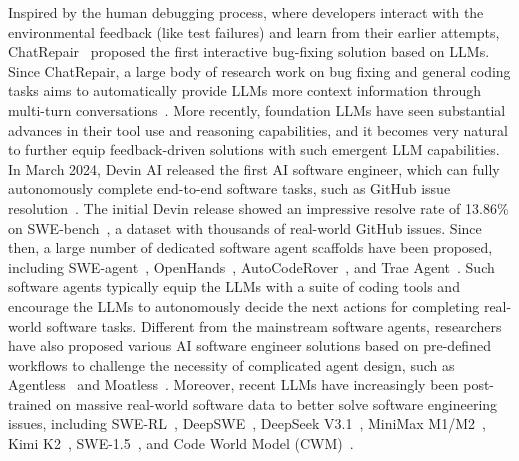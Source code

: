 \documentclass{article}
\renewcommand{\cite}{\citep}
\newcommand{\chatrepair}{ChatRepair\xspace}
\newcommand{\agentless}{Agentless\xspace}
\newcommand{\sweagent}{SWE-agent\xspace}
\newcommand{\openhands}{OpenHands\xspace}
\newcommand{\acr}{AutoCodeRover\xspace}
\newcommand{\swebench}{SWE-bench\xspace}
\begin{document}
Inspired by the human debugging process, where developers interact with the environmental feedback (like test failures) and learn from their earlier attempts, \chatrepair~\citep{xia2023conversational,xia2024automated} proposed the first interactive bug-fixing solution based on LLMs. Since \chatrepair, a large body of research work on bug fixing and general coding tasks aims to automatically provide LLMs more context information through multi-turn conversations~\citep{chen2023teaching, kong2025contrastrepair, yuan2024evaluating}. More recently, foundation LLMs have seen substantial advances in their tool use and reasoning capabilities, and it becomes very natural to further equip feedback-driven solutions with such emergent LLM capabilities. In March 2024, Devin AI released the first AI software engineer, which can fully autonomously complete end-to-end software tasks, such as GitHub issue resolution~\citep{devin}. The initial Devin release showed an impressive resolve rate of 13.86\% on \swebench~\citep{jimenez2023swe}, a dataset with thousands of real-world GitHub issues. Since then, a large number of dedicated software agent scaffolds have been proposed, including \sweagent~\citep{yang2024swe}, \openhands~\citep{wang2024openhands}, \acr~\citep{zhang2024autocoderover}, and Trae Agent~\citep{liu2024marscode}. Such software agents typically equip the LLMs with a suite of coding tools and encourage the LLMs to autonomously decide the next actions for completing real-world software tasks. Different from the mainstream software agents, researchers have also proposed various AI software engineer solutions based on pre-defined workflows to challenge the necessity of complicated agent design, such as \agentless~\citep{xia2024agentless} and Moatless~\citep{moatless}. Moreover, recent LLMs have increasingly been post-trained on massive real-world software data to better solve software engineering issues, including SWE-RL~\cite{wei2025swerl}, DeepSWE~\cite{luodeepswe}, DeepSeek V3.1~\cite{deepseekv31}, MiniMax M1/M2~\cite{chen2025minimax}, Kimi K2~\cite{team2025kimi}, SWE-1.5~\cite{swe15}, and Code World Model (CWM)~\cite{carbonneaux2025cwm}.
\end{document}
